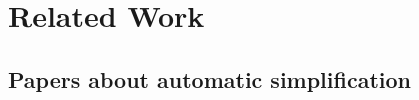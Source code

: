 %


\section{Related Work}
\label{sec:related}

\subsection{Papers about automatic simplification}

